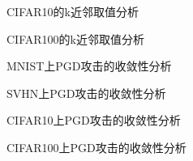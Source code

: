 \begin{figure}[t]
    \centering
    
    \caption{CIFAR10的k近邻取值分析}
    \label{fig-knn-cifar10}
\end{figure}

\begin{figure}[b]
    \centering
    
    \caption{CIFAR100的k近邻取值分析}
    \label{fig-knn-cifar100}
\end{figure}

\clearpage

\begin{figure}[t]
    \centering
    
    \caption{MNIST上PGD攻击的收敛性分析}
    \label{fig-pgd-mnist}
\end{figure}

\begin{figure}[t]
    \centering
    
    \caption{SVHN上PGD攻击的收敛性分析}
    \label{fig-pgd-svhn}
\end{figure}

\begin{figure}[t]
    \centering
    
    \caption{CIFAR10上PGD攻击的收敛性分析}
    \label{fig-pgd-cifar10}
\end{figure}

\begin{figure}[t]
    \centering
    
    \caption{CIFAR100上PGD攻击的收敛性分析}
    \label{fig-pgd-cifar100}
\end{figure}

\clearpage
